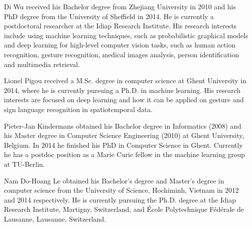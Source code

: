 


\begin{IEEEbiography}{Di Wu}
received his Bachelor degree from Zhejiang University in 2010 and his PhD degree from the University of Sheffield in 2014. He is currently a postdoctoral researcher at the Idiap Research Institute. His research interests include using machine learning techniques, such as probabilistic graphical models and deep learning for high-level computer vision tasks, such as human action recognition, gesture recognition, medical images analysis, person identification and multimedia retrieval.
\end{IEEEbiography}

\begin{IEEEbiography}{Lionel Pigou}
received a M.Sc. degree in computer science at Ghent University in 2014, where he is currently pursuing a Ph.D. in machine learning. His research interests are focused on deep learning and how it can be applied on gesture and sign language recognition in spatiotemporal data.
\end{IEEEbiography}


\begin{IEEEbiography}{Pieter-Jan Kindermans}
obtained his Bachelor degree in Informatics (2008) and his Master degree in Computer Science Engineering (2010) at Ghent University, Belgium. In 2014 he finished his PhD in Computer Science in Ghent. Currently he has a postdoc position as a Marie Curie fellow in the machine learning group at TU-Berlin.
\end{IEEEbiography}


\begin{IEEEbiography}{Nam Do-Hoang Le}
 obtained his Bachelor's degree and Master's degree in computer science from the University of Science, Hochiminh, Vietnam in 2012 and 2014 respectively.
He is currently pursuing the Ph.D. degree at the Idiap Research Institute, Martigny, Switzerland, and \'Ecole Polytechnique F\'ed\'erale de Lausanne, Lausanne, Switzerland.
\end{IEEEbiography}


